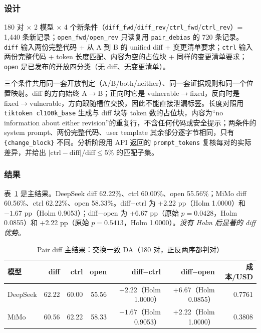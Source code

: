 \documentclass[conference]{IEEEtran}
\begin{document}
\subsubsection{设计}

180 对 $\times$ 2 模型 $\times$ 4 个新条件（\texttt{diff\_fwd}/\texttt{diff\_rev}/\texttt{ctrl\_fwd}/\texttt{ctrl\_rev}）= 1{,}440 条新记录；\texttt{open\_fwd}/\texttt{open\_rev} 只读复用 \texttt{pair\_debias} 的 720 条记录。\texttt{diff} 输入两份完整代码 + 从 A 到 B 的 unified diff + 变更清单要求；\texttt{ctrl} 输入两份完整代码 + token 长度匹配、内容为空的占位块 + 同样的变更清单要求；\texttt{open} 是已发布的开放四分类（无 diff、无变更清单）。

三个条件共用同一套开放判定（A/B/both/neither）、同一套证据规则和同一个位置映射。diff 的方向始终 A$\to$B；正向时它是 vulnerable$\to$fixed，反向时是 fixed$\to$vulnerable，方向跟随槽位交换，因此不能直接泄漏标签。长度对照用 \texttt{tiktoken cl100k\_base} 生成与 diff 块等 token 数的占位块，内容为“no information about either revision”的重复行，不含任何代码或安全提示；两条件的 system prompt、两份完整代码、user template 其余部分逐字节相同，只有 \texttt{\{change\_block\}} 不同。分析阶段用 API 返回的 \texttt{prompt\_tokens} 复核每对的实际差异，并给出 $|\text{ctrl}-\text{diff}|/\text{diff}\le5\%$ 的匹配子集。

\subsubsection{结果}

表~\ref{tab:pairdiff} 是主结果。DeepSeek diff 62.22\%、ctrl 60.00\%、open 55.56\%；MiMo diff 60.56\%、ctrl 62.22\%、open 58.33\%。diff$-$ctrl 为 +2.22 pp（Holm 1.0000）和 $-1.67$ pp（Holm 0.9053）；diff$-$open 为 +6.67 pp（原始 $p=0.0428$，Holm 0.0855）和 +2.22 pp（原始 $p=0.5413$，Holm 1.0000）。\emph{没有 Holm 后显著的 diff 优势}。

\begin{table}[t]
\centering
\caption{Pair diff 主结果：交换一致 DA（180 对，正反两序都判对）}
\label{tab:pairdiff}
\footnotesize
\setlength{\tabcolsep}{5pt}
\begin{tabular}{@{}lrrrrrr@{}}
\toprule
模型 & diff & ctrl & open & diff$-$ctrl & diff$-$open & 成本/USD \\
\midrule
DeepSeek & 62.22 & 60.00 & 55.56 & +2.22（Holm 1.0000） & +6.67（Holm 0.0855） & 0.7761 \\
MiMo & 60.56 & 62.22 & 58.33 & $-1.67$（Holm 0.9053） & +2.22（Holm 1.0000） & 0.3808 \\
\bottomrule
\end{tabular}
\end{table}
\end{document}
